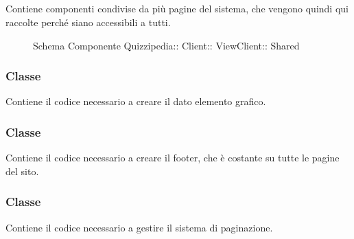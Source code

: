 \subsection{}
Contiene componenti condivise da più pagine del sistema, che vengono quindi qui raccolte perché siano accessibili a tutti.
\begin{figure}[H]
\centering
\noindent{}
\caption[Schema Componente Shared]{Schema Componente Quizzipedia:: Client:: ViewClient:: Shared}
\end{figure}
\subsubsection{Classe }
Contiene il codice necessario a creare il dato elemento grafico.
\begin{itemize}
\end{itemize}
\subsubsection{Classe }
Contiene il codice necessario a creare il footer, che è costante su tutte le pagine del sito.
\begin{itemize}
\end{itemize}
\subsubsection{Classe }
Contiene il codice necessario a gestire il sistema di paginazione.
\begin{itemize}
\end{itemize}
